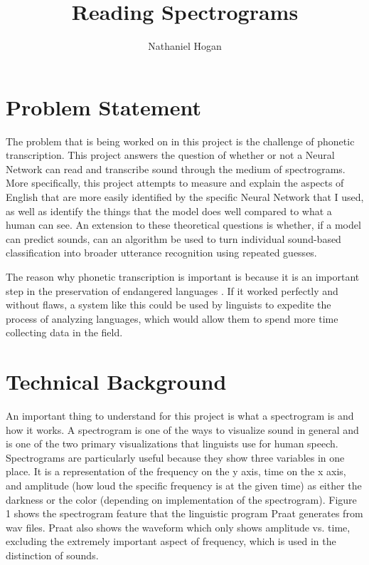 \documentclass[10pt,twocolumn]{article}
\title{Reading Spectrograms}
\author{Nathaniel Hogan}
\affiliation{Occidental College}
\begin{document}
\maketitle

\section{Problem Statement}

The problem that is being worked on in this project is the challenge of phonetic transcription. This project answers the question of whether or not a Neural Network can read and transcribe sound through the medium of spectrograms. More specifically, this project attempts to measure and explain the aspects of English that are more easily identified by the specific Neural Network that I used, as well as identify the things that the model does well compared to what a human can see. An extension to these theoretical questions is whether, if a model can predict sounds, can an algorithm be used to turn individual sound-based classification into broader utterance recognition using repeated guesses. 

The reason why phonetic transcription is important is because it is an important step in the preservation of endangered languages \cite{LanguageDeath}. If it worked perfectly and without flaws, a system like this could be used by linguists to expedite the process of analyzing languages, which would allow them to spend more time collecting data in the field.

\section{Technical Background}

An important thing to understand for this project is what a spectrogram is and how it works. A spectrogram is one of the ways to visualize sound in general and is one of the two primary visualizations that linguists use for human speech. Spectrograms are particularly useful because they show three variables in one place. It is a representation of the frequency on the y axis, time on the x axis, and amplitude (how loud the specific frequency is at the given time) as either the darkness or the color (depending on implementation of the spectrogram). Figure 1 shows the spectrogram feature that the linguistic program Praat generates from wav files. Praat also shows the waveform which only shows amplitude vs. time, excluding the extremely important aspect of frequency, which is used in the distinction of sounds. 
\end{document}

